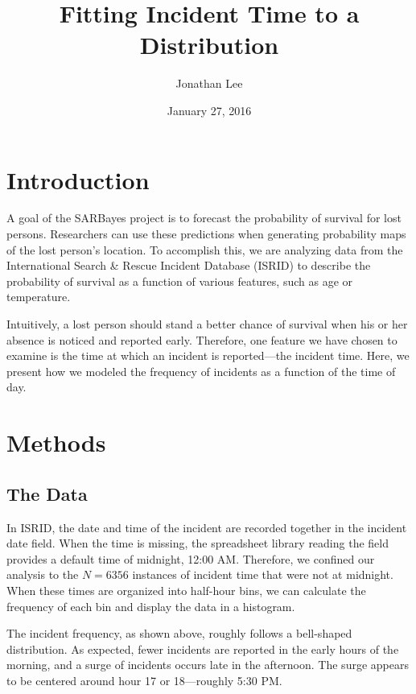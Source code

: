 \documentclass[12pt]{article}
\begin{document}
  \title{Fitting Incident Time to a Distribution}
  \author{Jonathan Lee}
  \date{January 27, 2016}
  \maketitle

  \section{Introduction}
    A goal of the SARBayes project is to forecast the probability of survival
    for lost persons. Researchers can use these predictions when generating
    probability maps of the lost person's location. To accomplish this, we are
    analyzing data from the International Search \& Rescue Incident Database
    (ISRID) \cite{isrid} to describe the probability of survival as a function
    of various features, such as age or temperature.

    Intuitively, a lost person should stand a better chance of survival when
    his or her absence is noticed and reported early. Therefore, one feature we
    have chosen to examine is the time at which an incident is reported—the
    incident time. Here, we present how we modeled the frequency of incidents
    as a function of the time of day.

  \section{Methods}
    \subsection{The Data}
      In ISRID, the date and time of the incident are recorded together in the
      incident date field. When the time is missing, the spreadsheet library
      reading the field provides a default time of midnight, 12:00 AM.
      Therefore, we confined our analysis to the \(N = 6356\) instances of
      incident time that were not at midnight. When these times are organized
      into half-hour bins, we can calculate the frequency of each bin and
      display the data in a histogram.

      

      The incident frequency, as shown above, roughly follows a bell-shaped
      distribution. As expected, fewer incidents are reported in the early
      hours of the morning, and a surge of incidents occurs late in the
      afternoon. The surge appears to be centered around hour 17 or
      18---roughly 5:30 PM.
\end{document}
